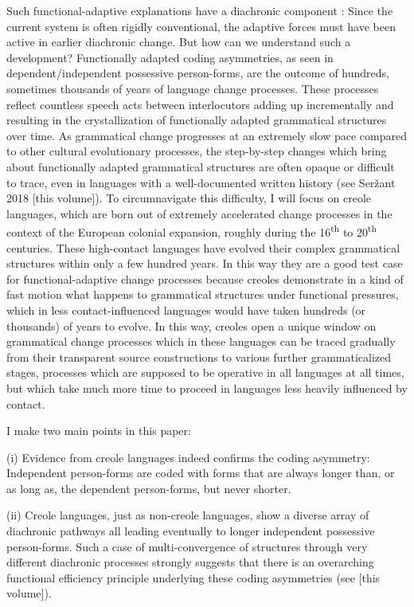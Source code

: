 \documentclass[output=paper]{langsci/langscibook}
\begin{document}
Such functional-adaptive explanations have a diachronic component \citep{Bybee1988}: Since the current system is often rigidly conventional, the adaptive forces must have been active in earlier diachronic change. But how can we understand such a development? Functionally adapted coding asymmetries, as seen in dependent/independent possessive person-forms, are the outcome of hundreds, sometimes thousands of years of language change processes. These processes reflect countless speech acts between interlocutors adding up incrementally and resulting in the crystallization of functionally adapted grammatical structures over time. As grammatical change progresses at an extremely slow pace compared to other cultural evolutionary processes, the step-by-step changes which bring about functionally adapted grammatical structures are often opaque or difficult to trace, even in languages with a well-documented written history (see Seržant 2018 [this volume]). To circumnavigate this difficulty, I will focus on creole languages, which are born out of extremely accelerated change processes in the context of the European colonial expansion, roughly during the 16\textsuperscript{th} to 20\textsuperscript{th} centuries. These high-contact languages have evolved their complex grammatical structures within only a few hundred years. In this way they are a good test case for functional-adaptive change processes because creoles demonstrate in a kind of fast motion what happens to grammatical structures under functional pressures, which in less contact-influenced languages would have taken hundreds (or thousands) of years to evolve. In this way, creoles open a unique window on grammatical change processes which in these languages can be traced gradually from their transparent source constructions to various further grammaticalized stages, processes which are supposed to be operative in all languages at all times, but which take much more time to proceed in languages less heavily influenced by contact. 

I make two main points in this paper:

(i) Evidence from creole languages indeed confirms the coding asymmetry: Independent person-forms are coded with forms that are always longer than, or as long as, the dependent person-forms, but never shorter.

(ii) Creole languages, just as non-creole languages, show a diverse array of diachronic pathways all leading eventually to longer independent possessive person-forms. Such a case of multi-convergence of structures through very different diachronic processes strongly suggests that there is an overarching functional efficiency principle underlying these coding asymmetries (see \citealt{Haspelmath2018} [this volume]). 
\end{document}

